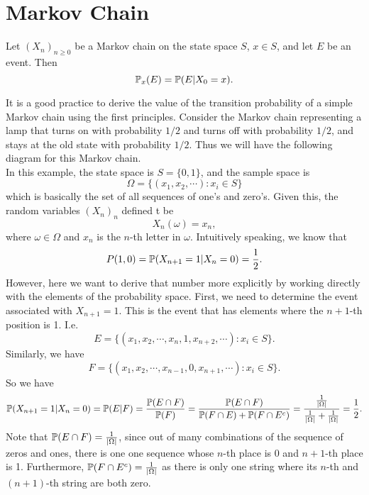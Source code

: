 \chapter{Markov Chain}

\begin{notation}
	Let $(X_n)_{n\geq0}$ be a Markov chain on the state space $S$, $x\in S$, and let $E$ be an event. Then
	\[  \mathbb{P}_x(E) = \mathbb{P}(E|X_0=x) . \]
\end{notation}


\begin{example}
	It is a good practice to derive the value of the transition probability of a simple Markov chain using the first principles. Consider the Markov chain representing a lamp that turns on with probability $1/2$ and turns off with probability $1/2$, and stays at the old state with probability $1/2$. Thus we will have the following diagram for this Markov chain.
	\\
	In this example, the state space is $S = \{0,1\}$, and the sample space is
	\[ \Omega = \{ (x_1,x_2,\cdots): x_i \in S \} \]
	which is basically the set of all sequences of one's and zero's. Given this, the random variables $(X_n)_n$ defined t be
	\[  X_n (\omega) = x_n, \]  
	where $\omega \in \Omega$ and $x_n$ is the $n$-th letter in $\omega$. Intuitively speaking, we know that 
	\[  P(1,0) = \mathbb{P}(X_{n+1} = 1 | X_n = 0) = \frac{1}{2}. \]
	However, here we want to derive that number more explicitly by working directly with the elements of the probability space. First, we need to determine the event associated with $X_{n+1} = 1$. This is the event that has elements where the $n+1$-th position is 1. I.e.
	\[  E = \{  (x_1,x_2, \cdots, x_n, 1, x_{n+2}, \cdots) : x_i \in S\}.  \]
	Similarly, we have
	\[ F = \{ (x_1,x_2, \cdots, x_{n-1},0,x_{n+1},\cdots): x_i \in S \}. \]
	So we have
	\[ \mathbb{P}(X_{n+1} = 1 | X_n = 0)  = \mathbb{P}(E|F) = \frac{\mathbb{P}(E\cap F)}{\mathbb{P}(F)} =\frac{\mathbb{P}(E\cap F)}{\mathbb{P}(F\cap E) + \mathbb{P}(F\cap E^c)} = \frac{\frac{1}{|\Omega|}}{\frac{1}{|\Omega|} + \frac{1}{|\Omega|}} = \frac{1}{2}. \]
	Note that $\mathbb{P}(E\cap F) = \frac{1}{|\Omega|}$, since out of many combinations of the sequence of zeros and ones, there is one one sequence whose $n$-th place is 0 and $n+1$-th place is 1. Furthermore, $\mathbb{P}(F\cap E^c) = \frac{1}{|\Omega|}$ as there is only one string where its $n$-th and $(n+1)$-th string are both zero. 
\end{example}

